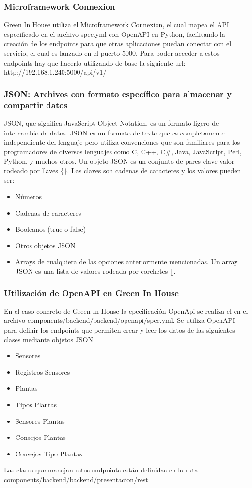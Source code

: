         \subsubsection{Microframework Connexion}
        Green In House utiliza el Microframework Connexion, el cual mapea el
        API especificado en el archivo spec.yml con OpenAPI en Python, facilitando la creación de los endpoints para que otras aplicaciones puedan conectar con el servicio, el cual es lanzado en el puerto 5000. Para poder acceder a estos endpoints hay que hacerlo utilizando de base la siguiente url: http://192.168.1.240:5000/api/v1/
        \subsubsection{JSON: Archivos con formato específico para almacenar y compartir datos}
        JSON, que significa JavaScript Object Notation, es un formato ligero de intercambio de datos. JSON es un formato de texto que es completamente independiente del lenguaje pero utiliza convenciones que son familiares para los programadores de diversos lenguajes como C, C++, C\#, Java, JavaScript, Perl, Python, y muchos otros.
            Un objeto JSON es un conjunto de pares clave-valor rodeado por llaves \{\}. Las claves son cadenas de caracteres y los valores pueden ser:
            \begin{itemize}
                \item Números
                \item Cadenas de caracteres
                \item Booleanos (true o false)
                \item Otros objetos JSON
                \item Arrays de cualquiera de las opciones anteriormente mencionadas. Un array JSON es una lista de valores rodeada por corchetes [].
            \end{itemize}
        \subsubsection{Utilización de OpenAPI en Green In House}
        En el caso concreto de Green In House la epecificación OpenApi se realiza el en el archivo components/backend/backend/openapi/spec.yml. Se utiliza OpenAPI para definir los endpoints que permiten crear y leer los datos de las siguientes clases mediante objetos JSON:
        \begin{itemize}
            \item Sensores
            \item Registros Sensores
            \item Plantas
            \item Tipos Plantas
            \item Sensores Plantas
            \item Consejos Plantas
            \item Consejos Tipo Plantas
        \end{itemize}
        Las clases que manejan estos endpoints están definidas en la ruta components/backend/backend/presentacion/rest

